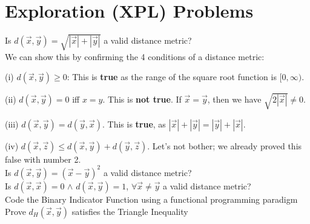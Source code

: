 \section{Exploration (XPL) Problems}

\begin{outline}[enumerate]

\1  Is $d(\vec{x},\vec{y}) = \sqrt{|\vec{x}| + |\vec{y}|}$ a valid distance metric? \\

We can show this by confirming the 4 conditions of a distance metric:

(i) $d(\vec{x},\vec{y}) \ge 0$: This is \textbf{true} as the range of the square root function is $[0,\infty)$.

(ii) $d(\vec{x},\vec{y}) = 0$ iff $x=y$. This is \textbf{not true}. If $\vec{x}=\vec{y}$, then we have $\sqrt{2|\vec{x}|} \neq 0$.

(iii) $d(\vec{x},\vec{y}) = d(\vec{y},\vec{x})$. This is \textbf{true}, as $|\vec{x}| + |\vec{y}| = |\vec{y}| + |\vec{x}|$.

(iv) $d(\vec{x},\vec{z}) \leq d(\vec{x},\vec{y}) + d(\vec{y},\vec{z})$. Let's not bother; we already proved this false with number 2. \\


\1  Is $d(\vec{x},\vec{y}) = (\vec{x} - \vec{y})^2$ a valid distance metric? \\

\1 Is $d(\vec{x},\vec{x}) = 0$ $\wedge$ $d(\vec{x},\vec{y}) = 1$, $\forall \vec{x} \neq \vec{y}$ a valid distance metric? \\

\1  Code the Binary Indicator Function using a functional programming paradigm \\

\1 Prove $d_H(\vec{x},\vec{y})$ satisfies the Triangle Inequality
\end{outline}
